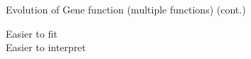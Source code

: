\documentclass[10pt,aspectratio=169]{beamer}
\newcounter{frame}[frame]
\begin{document}
\begin{frame}[c]{Evolution of Gene function (multiple functions) (cont.)}
\begin{minipage}[t]{.19\linewidth}
{			Easier to fit \\
			Easier to interpret}	
	\end{minipage}\hfill
\end{frame}
\end{document}
